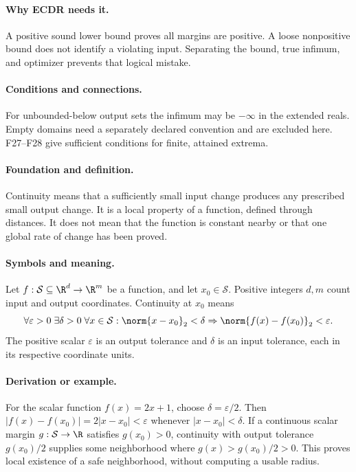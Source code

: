 \paragraph{Why ECDR needs it.}
A positive sound lower bound proves all margins are positive. A loose
nonpositive bound does not identify a violating input. Separating the
bound, true infimum, and optimizer prevents that logical mistake.
\paragraph{Conditions and connections.}
For unbounded-below output sets the infimum may be $-\infty$ in the
extended reals. Empty domains need a separately declared convention and
are excluded here. F27--F28 give sufficient conditions for finite,
attained extrema.

\paragraph{Foundation and definition.}
Continuity means that a sufficiently small input change produces any
prescribed small output change. It is a local property of a function,
defined through distances. It does not mean that the function is
constant nearby or that one global rate of change has been proved.
\paragraph{Symbols and meaning.}
Let $f:\mathcal S\subseteq\R^d\to\R^m$ be a function, and let
$x_0\in\mathcal S$. Positive integers $d,m$ count input and output
coordinates. Continuity at $x_0$ means
\[
 \forall\varepsilon>0\;\exists\delta>0\;\forall x\in\mathcal S:
 \norm{x-x_0}_2<\delta
 \Rightarrow\norm{f(x)-f(x_0)}_2<\varepsilon.
\]
The positive scalar $\varepsilon$ is an output tolerance and $\delta$
is an input tolerance, each in its respective coordinate units.
\paragraph{Derivation or example.}
For the scalar function $f(x)=2x+1$, choose
$\delta=\varepsilon/2$. Then
$|f(x)-f(x_0)|=2|x-x_0|<\varepsilon$ whenever
$|x-x_0|<\delta$. If a continuous scalar margin
$g:\mathcal S\to\R$ satisfies $g(x_0)>0$, continuity with output
tolerance $g(x_0)/2$ supplies some neighborhood where
$g(x)>g(x_0)/2>0$. This proves local existence of
a safe neighborhood, without computing a usable radius.
